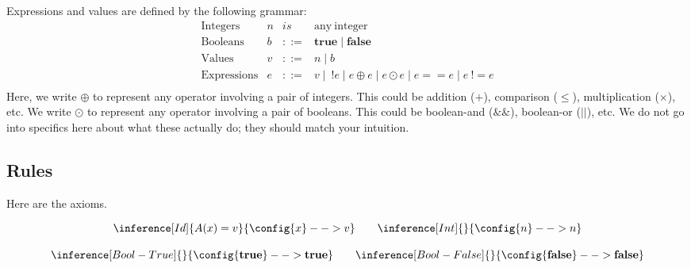 \documentclass[10pt]{article}
\begin{document}
Expressions and values are defined by the following grammar:
\[
\begin{array}{lrcl}
\mathrm{Integers} & n & \mathit{is} & \mathrm{any\ integer}\\
\mathrm{Booleans} & b & \mathtt{::=} & \mathbf{true} \mid \mathbf{false} \\
\mathrm{Values} & v & \mathtt{::=} & n \mid b \\
\mathrm{Expressions} & e & \mathtt{::=} & v \mid\ !e \mid e \oplus e \mid e \odot e \mid e == e \mid
                   e\ != e \\
\end{array}
\]
Here, we write $\oplus$ to represent any operator involving a pair of
integers. This could be addition ($+$), comparison ($\leq$),
multiplication ($\times$), etc. We write $\odot$ to represent any
operator involving a pair of booleans. This could be boolean-and
($\&\&$), boolean-or ($||$), etc. We do not go into specifics here
about what these actually do; they should match your
intuition.

\subsection{Rules}


Here are the axioms.

$$
\begin{array}{c}

\inference[Id]
{A(x) = v}
{\config{x} --> v}
\qquad

\inference[Int]
{}
{\config{n} --> n}
\\ \\

\inference[Bool-True]
{}
{\config{\mathbf{true}} --> \mathbf{true}}

\qquad

\inference[Bool-False]
{}
{\config{\mathbf{false}} --> \mathbf{false}}
\\ \\ \\

\end{array}
$$
\end{document}
